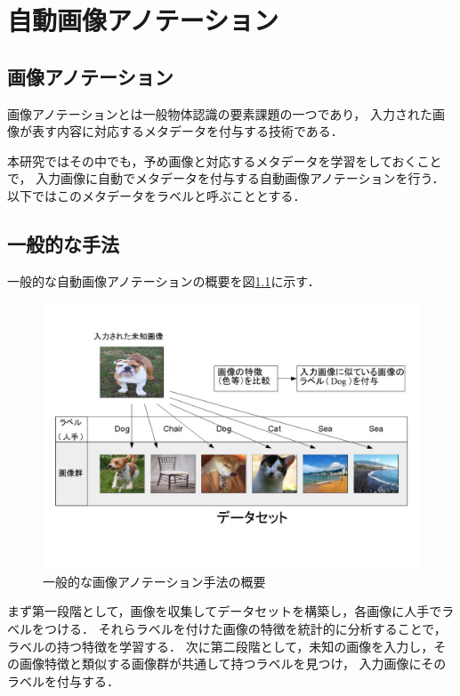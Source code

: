 \chapter{自動画像アノテーション}
\section{画像アノテーション}
画像アノテーションとは一般物体認識の要素課題の一つであり，
入力された画像が表す内容に対応するメタデータを付与する技術である．

本研究ではその中でも，予め画像と対応するメタデータを学習をしておくことで，
入力画像に自動でメタデータを付与する自動画像アノテーションを行う．
以下ではこのメタデータをラベルと呼ぶこととする．

\section{一般的な手法}
一般的な自動画像アノテーションの概要を図\ref{fig:abst}に示す．

\begin{figure}[tb]
 \begin{center}
  \includegraphics[scale=0.50]{gaiyou.jpg}
 \end{center}
 \caption{一般的な画像アノテーション手法の概要}
 \label{fig:abst}
\end{figure}

まず第一段階として，画像を収集してデータセットを構築し，各画像に人手でラベルをつける．
それらラベルを付けた画像の特徴を統計的に分析することで，ラベルの持つ特徴を学習する．
次に第二段階として，未知の画像を入力し，その画像特徴と類似する画像群が共通して持つラベルを見つけ，
入力画像にそのラベルを付与する．

